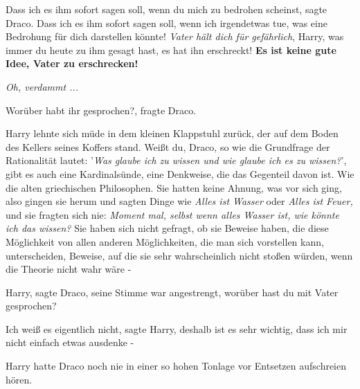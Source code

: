 \glqq{}Dass ich es ihm sofort sagen soll, wenn du mich zu bedrohen
scheinst\grqq{}, sagte Draco. \glqq{}Dass ich es ihm sofort sagen soll, wenn ich
irgendetwas tue, was eine Bedrohung für dich darstellen könnte! \emph{Vater hält
dich für gefährlich}, Harry, was immer du heute zu ihm gesagt hast, es hat ihn
erschreckt! \textbf{Es ist keine gute Idee, Vater zu erschrecken!}\grqq{}

\emph{Oh, verdammt ...}

\glqq{}Worüber habt ihr gesprochen?\grqq{}, fragte Draco.

Harry lehnte sich müde in dem kleinen Klappstuhl zurück, der auf dem Boden des
Kellers seines Koffers stand. \glqq{}Weißt du, Draco, so wie die Grundfrage der
Rationalität lautet: '\emph{Was glaube ich zu wissen und wie glaube ich es zu
wissen?}', gibt es auch eine Kardinalsünde, eine Denkweise, die das Gegenteil
davon ist. Wie die alten griechischen Philosophen. Sie hatten keine Ahnung, was
vor sich ging, also gingen sie herum und sagten Dinge wie \emph{\glqq{}Alles ist
Wasser\grqq{}} oder \emph{\glqq{}Alles ist Feuer\grqq{},} und sie fragten sich
nie:\emph{ \glqq{}Moment mal, selbst wenn alles Wasser ist, wie könnte ich das
wissen?} Sie haben sich nicht gefragt, ob sie Beweise haben, die diese
Möglichkeit von allen anderen Möglichkeiten, die man sich vorstellen kann,
unterscheiden, Beweise, auf die sie sehr wahrscheinlich nicht stoßen würden,
wenn die Theorie nicht wahr wäre -\grqq{}

\glqq{}Harry\grqq{}, sagte Draco, seine Stimme war angestrengt, \glqq{}worüber
hast du mit Vater gesprochen?\grqq{}

\glqq{}Ich weiß es eigentlich nicht\grqq{}, sagte Harry, \glqq{}deshalb ist es
sehr wichtig, dass ich mir nicht einfach etwas ausdenke -\grqq{}

Harry hatte Draco noch nie in einer so hohen Tonlage vor Entsetzen aufschreien
hören.

